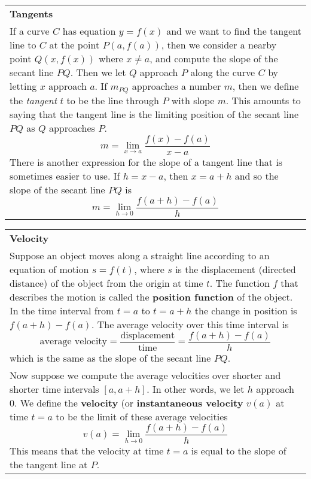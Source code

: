 \documentclass[fleqn]{article}
\begin{document}
\begin{center}
\large
\def\arraystretch{1.3}
{\setlength{\tabcolsep}{16pt}
\begin{tabularx}{.9\textwidth}{|X|}
\hline
	\vspace{1pt}
	\textbf{Tangents} \\
	If a curve $C$ has equation $y = f(x)$ and we want to find the tangent line to $C$ at the point $P(a, f(a))$, then we consider a nearby point $Q(x, f(x))$ where $x \ne a$, and compute the slope of the secant line $PQ$. Then we let $Q$ approach $P$ along the curve $C$ by letting $x$ approach $a$. If $m_{PQ}$ approaches a number $m$, then we define the \textit{tangent} $t$ to be the line through $P$ with slope $m$. This amounts to saying that the tangent line is the limiting position of the secant line $PQ$ as $Q$ approaches $P$.
	$$m = \underset{x \to a}{\lim} \dfrac{f(x) - f(a)}{x-a}$$
	There is another expression for the slope of a tangent line that is sometimes easier to use. If $h=x-a$, then $x=a+h$ and so the slope of the secant line $PQ$ is 
	$$m = \underset{h \to 0}{\lim} \dfrac{f(a+h) - f(a)}{h}$$
	\\
	\hline
\end{tabularx}}
\vspace{12pt}

\def\arraystretch{1.3}
{\setlength{\tabcolsep}{16pt}
\begin{tabularx}{.9\textwidth}{|X|}
\hline
	\vspace{1pt}
	\textbf{Velocity} \\
	Suppose an object moves along a straight line according to an equation of motion $s = f(t)$, where $s$ is the displacement (directed distance) of the object from the origin at time $t$. The function $f$ that describes the motion is called the \textbf{position function} of the object. In the time interval from $t=a$ to $t=a+h$ the change in position is $f(a+h) - f(a)$. The average velocity over this time interval is
	$$\text{average velocity} = \dfrac{\text{displacement}}{\text{time}} = \dfrac{f(a+h) - f(a)}{h}$$
	which is the same as the slope of the secant line $PQ$. \\
	Now suppose we compute the average velocities over shorter and shorter time intervals $[a, a+h]$. In other words, we let $h$ approach $0$. We define the \textbf{velocity} (or \textbf{instantaneous velocity} $v(a)$ at time $t=a$ to be the limit of these average velocities
	$$v(a) = \underset{h \to 0}{\lim} \dfrac{f(a+h) - f(a)}{h}$$
	This means that the velocity at time $t=a$ is equal to the slope of the tangent line at $P$. 
	\\[16pt]
	\hline
\end{tabularx}}
\vspace{12pt}


\end{center}
\end{document}
